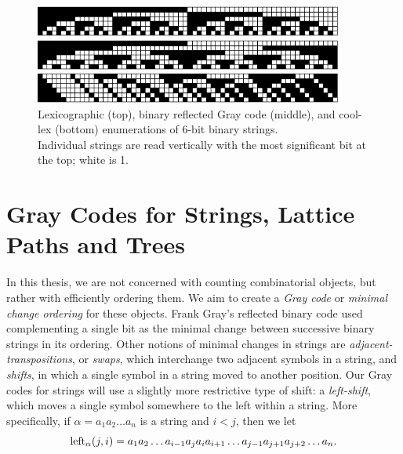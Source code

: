 \begin{figure}
    \centering
\includegraphics[width=4in]{BLX6-cropped.pdf} 

\includegraphics[width=4in]{BRGC6-cropped.pdf} 

\includegraphics[width=4in]{BCLX6-cropped.pdf} 

    \caption{Lexicographic (top), binary reflected Gray code (middle), and cool-lex (bottom) enumerations of 6-bit binary strings. \\ 
    Individual strings are read vertically with the most significant bit at the top; white is 1.
    }
    \label{binary}
\end{figure}

\section{Gray Codes for Strings, Lattice Paths and Trees} \label{sec:intro_graycodes}
In this thesis, we are not concerned with counting combinatorial objects, but rather with efficiently ordering them.  We aim to create a \emph{Gray code} or \emph{minimal change ordering} for these objects.  Frank Gray's reflected binary code used complementing a single bit as the minimal change between successive binary strings in its ordering.  Other notions of minimal changes in strings are \emph{adjacent-transpositions}, or \emph{swaps}, which interchange two adjacent symbols in a string, and \emph{shifts}, in which a single symbol in a string moved to another position. Our Gray codes for strings will use a slightly more restrictive type of shift: a \emph{left-shift}, which moves a single symbol somewhere to the left within a string. 
More specifically, if $\alpha = a_1 a_2 \ldots a_n$ is a string and $i < j$, then we let
\begin{equation}
    \leftshift[\alpha]{j}{i} = a_1 a_2 \ldots a_{i-1} a_j a_{i} a_{i+1} \ldots a_{j-1} a_{j+1} a_{j+2} \ldots a_n. \label{eq:leftdef}
\end{equation}

